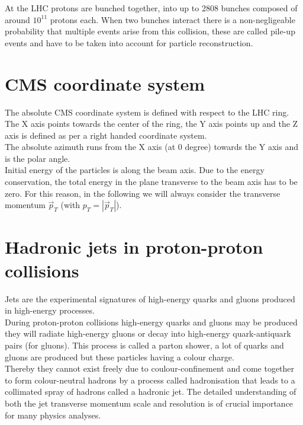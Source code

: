 At the LHC protons are bunched together, into up to 2808 bunches composed of around $10^{11}$ protons each.
When two bunches interact there is a non-negligeable probability that multiple events arise from this collision, these
are called pile-up events and have to be taken into account for particle reconstruction.

\section{CMS coordinate system}

The absolute CMS coordinate system is defined with respect to the LHC ring. The X axis points towards the center
of the ring, the Y axis points up and the Z axis is defined as per a right handed coordinate system. \\
The absolute azimuth \textphi runs from the X axis (at 0 degree) towards the Y axis and \texteta is the polar angle.\\
Initial energy of the particles is along the beam axis. Due to the energy conservation, the total energy in the plane
transverse to the beam axis has to be zero. For this reason, in the following we will always consider the transverse
momentum $\vec{p}_{T}$ (with $p_{T} = |\vec{p}_{T}|$).


\section{Hadronic jets in proton-proton collisions}

Jets are the experimental signatures of high-energy quarks and gluons produced in high-energy processes.\\
During proton-proton collisions high-energy quarks and gluons may be produced they will radiate high-energy gluons or
decay into high-energy quark-antiquark pairs (for gluons). This process is called a parton shower, a lot of quarks and
gluons are produced but these particles having a colour charge.\\
Thereby they cannot exist freely due to coulour-confinement and come together to form colour-neutral hadrons by a process called
hadronisation that leads to a collimated spray of hadrons called a hadronic jet.
The detailed understanding of both the jet transverse momentum scale and resolution is of crucial importance for many physics analyses.


